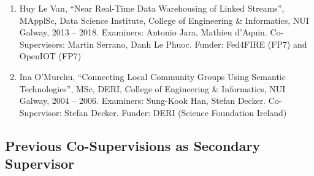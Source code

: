 \documentclass[10pt,a4paper]{res} %
\begin{document}
\begin{resume}
\begin{itemize}
\begin{enumerate}
\item Huy Le Van, ``Near Real-Time Data Warehousing of Linked Streams'', MApplSc, Data Science Institute, College of Engineering \& Informatics, NUI Galway, 2013 -- 2018. Examiners: Antonio Jara, Mathieu d'Aquin. Co-Supervisors: Martin Serrano, Danh Le Phuoc. Funder: Fed4FIRE (FP7) and OpenIOT (FP7)
\item Ina O'Murchu, ``Connecting Local Community Groups Using Semantic Technologies'', MSc, DERI, College of Engineering \& Informatics, NUI Galway, 2004 -- 2006. Examiners: Sung-Kook Han, Stefan Decker. Co-Supervisor: Stefan Decker. Funder: DERI (Science Foundation Ireland)
\end{enumerate}
\end{itemize}

\subsection*{Previous Co-Supervisions as Secondary Supervisor}


\end{resume}
\end{document}
